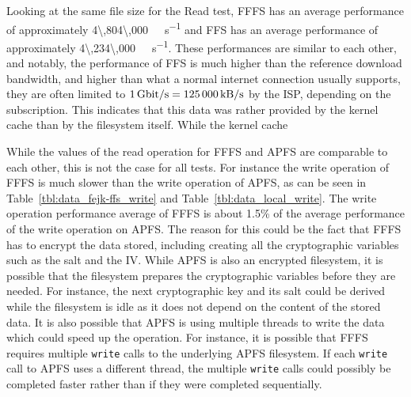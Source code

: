 Looking at the same file size for the Read test, \gls{FFFS} has an average performance of approximately \SI[per-mode = symbol]{4\,804\,000}{\kilo\byte\per\second} and \gls{FFS} has an average performance of approximately \SI[per-mode = symbol]{4\,234\,000}{\kilo\byte\per\second}. These performances are similar to each other, and notably, the performance of \gls{FFS} is much higher than the reference download bandwidth, and higher than what a normal internet connection usually supports, they are often limited to $\text{\SI[per-mode = symbol]{1}{\giga\bit\per\second}} = \text{\SI[per-mode = symbol]{125\,000}{\kilo\byte\per\second}}$ by the ISP, depending on the subscription. This indicates that this data was rather provided by the kernel cache than by the filesystem itself. While the kernel cache 

While the values of the read operation for \gls{FFFS} and \gls{APFS} are comparable to each other, this is not the case for all tests. For instance the write operation of \gls{FFFS} is much slower than the write operation of \gls{APFS}, as can be seen in Table~\ref{tbl:data_fejk-ffs_write} and Table~\ref{tbl:data_local_write}. The write operation performance average of \gls{FFFS} is about 1.5\% of the average performance of the write operation on \gls{APFS}. The reason for this could be the fact that \gls{FFFS} has to encrypt the data stored, including creating all the cryptographic variables such as the salt and the \gls{IV}. While \gls{APFS} is also an encrypted filesystem, it is possible that the filesystem prepares the cryptographic variables before they are needed. For instance, the next cryptographic key and its salt could be derived while the filesystem is idle as it does not depend on the content of the stored data. It is also possible that \gls{APFS} is using multiple threads to write the data which could speed up the operation. For instance, it is possible that \gls{FFFS} requires multiple \texttt{write} calls to the underlying \gls{APFS} filesystem. If each \texttt{write} call to \gls{APFS} uses a different thread, the multiple \texttt{write} calls could possibly be completed faster rather than if they were completed sequentially. 

